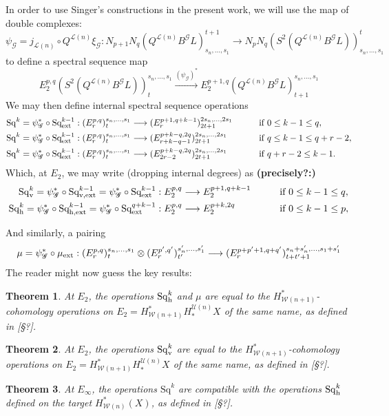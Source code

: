 \documentclass[11pt]{amsart}
\theoremstyle{plain}
\newtheorem{thm}{Theorem}[section]
\theoremstyle{definition}
\renewcommand{\to}{\longrightarrow}
\newcommand{\scrG}{\mathscr{G}}
\newcommand{\calU}{\mathcal{U}}
\newcommand{\calL}{\mathcal{L}}
\newcommand{\calw}{\mathcal{W}}
\theoremstyle{plain}
\newcommand{\BSW}{{\scrG}}
\newcommand{\BSWres}{B^\BSW}%
\newcommand{\ExtCohOp}{\textup{Sq}_\textup{ext}}
\newcommand{\vExtCohOp}{\textup{Sq}_\textup{v,ext}}
\newcommand{\hExtCohOp}{\textup{Sq}_\textup{h,ext}}
\newcommand{\ExtCohProd}{\mu_\textup{ext}}
\newcommand{\Sq}{\mathrm{Sq}}
\newcommand{\Sqh}{\mathrm{Sq}_\textup{h}}
\newcommand{\Sqv}{\mathrm{Sq}_\textup{v}}
\begin{document}
\begin{Operations in composite functor spectral sequences}
In order to use Singer's constructions in the present work, we will use the map of double complexes:
\[\psi_{\BSW}=j_{\calL(n)}\circ Q^{\calL(n)}\xi_\BSW:N_{p+1}N_q(Q^{\calL(n)}\BSWres L)_{s_n,\ldots,s_1}^{t+1}\to N_{p}N_q(S^2(Q^{\calL(n)}\BSWres L))_{s_n,\ldots,s_1}^{t}\]
to define a spectral sequence map
\[E_2^{p,q}(S^2(Q^{\calL(n)}\BSWres L))^{s_n,\ldots,s_1}_t\overset{(\psi_\BSW)^*}{\to} E_2^{p+1,q}(Q^{\calL(n)}\BSWres L)^{s_n,\ldots,s_1}_{t+1}\]
We may then define internal spectral sequence operations
\begin{alignat*}{2}
\Sq^k=\psi_{\BSW}^*\circ\ExtCohOp^{k-1}:(E^{p,q}_r)^{s_n,\ldots,s_1}_t&\to (E^{p+1,q+k-1}_r)^{2s_n,\ldots,2s_1}_{2t+1}&\qquad&\text{if }0\leq k-1 \leq q,\\
\Sq^k=\psi_{\BSW}^*\circ\ExtCohOp^{k-1}:(E^{p,q}_r)^{s_n,\ldots,s_1}_t&\to (E^{p+k-q,2q}_{r+k-q-1})^{2s_n,\ldots,2s_1}_{2t+1}&\qquad&\text{if }q\leq k-1\leq q+r-2,\\
\Sq^k=\psi_{\BSW}^*\circ\ExtCohOp^{k-1}:(E^{p,q}_r)^{s_n,\ldots,s_1}_t&\to (E^{p+k-q,2q}_{2r-2})^{2s_n,\ldots,2s_1}_{2t+1}&\qquad&\text{if }q+r-2\leq k-1.
\end{alignat*}
Which, at $E_2$, we may write (dropping internal degrees) as \textbf{(precisely?:)}
\begin{alignat*}{2}
\Sqv^k=\psi_{\BSW}^*\circ\vExtCohOp^{k-1}= \psi_{\BSW}^*\circ\ExtCohOp^{k-1}:E^{p,q}_2&\to E^{p+1,q+k-1}_2&\qquad&\text{if }0\leq k-1 \leq q,\\
\Sqh^k=\psi_{\BSW}^*\circ\hExtCohOp^{k-1}= \psi_{\BSW}^*\circ\ExtCohOp^{q+k-1}:E^{p,q}_2&\to E^{p+k,2q}_2&\qquad&\text{if }0\leq k-1 \leq p,
\end{alignat*}

And similarly, a pairing
\[\mu=\psi_{\BSW}^*\circ\ExtCohProd:(E^{p,q}_r)^{s_n,\ldots,s_1}_t\otimes (E^{p',q'}_r)^{s'_n,\ldots,s'_1}_{t'}\to (E^{p+p'+1,q+q'}_r)^{s_n+s'_n,\ldots,s_1+s'_1}_{t+t'+1}\]
The reader might now guess the key results:
\begin{thm}\label{E2CompFuncLieOperationsID}
At $E_2$, the operations $\Sqh^k$ and $\mu$ are equal to the $H^*_{\calw(n+1)}$-cohomology operations on $E_2=H^*_{\calw(n+1)}H_*^{\calU(n)}X$ of the same name, as defined in [\S?].
\end{thm}
\begin{thm}\label{E2CompFuncKosOperationsID}
At $E_2$, the operations $\Sqv^k$ are equal to the $H^*_{\calw(n+1)}$-cohomology operations on $E_2=H^*_{\calw(n+1)}H_*^{\calU(n)}X$ of the same name, as defined in [\S?].
\end{thm}
\begin{thm}\label{EInftyCompFuncOperationsID}
At $E_\infty$, the operations $\Sq^k$ are compatible with the operations $\Sqh^k$ defined on the target $H^*_{\calw(n)}(X)$, as defined in [\S?].
\end{thm} 

\end{Operations in composite functor spectral sequences}
\end{document}
